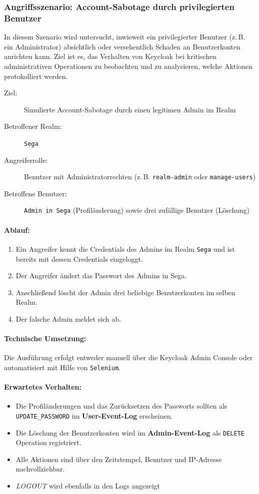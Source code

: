 \documentclass[a4paper,12pt]{article}
\begin{document}
	\subsubsection{Angriffsszenario: Account-Sabotage durch privilegierten Benutzer}
	In diesem Szenario wird untersucht, inwieweit ein privilegierter Benutzer (z.\,B. ein Administrator) absichtlich oder versehentlich Schaden an Benutzerkonten anrichten kann. Ziel ist es, das Verhalten von Keycloak bei kritischen administrativen Operationen zu beobachten und zu analysieren, welche Aktionen protokolliert werden.
	
	\begin{description}
		\item[Ziel:] Simulierte Account-Sabotage durch einen legitimen Admin im Realm
		\item[Betroffener Realm:] \texttt{Sega}
		\item[Angreiferrolle:] Benutzer mit Administratorrechten (z.\,B. \texttt{realm-admin} oder \texttt{manage-users})
		\item[Betroffene Benutzer:] \texttt{Admin in Sega} (Profiländerung) sowie drei zufällige Benutzer (Löschung)
	\end{description}
	
	\paragraph{Ablauf:}
	\begin{enumerate}
		\item Ein Angreifer kennt die Credentials des Admins im Realm \texttt{Sega} und ist bereits mit dessen Credentials eingeloggt.
		\item Der Angreifer ändert das Passwort des Admins in Sega.
		\item Anschließend löscht der Admin drei beliebige Benutzerkonten im selben Realm.
		\item Der falsche Admin meldet sich ab.
	\end{enumerate}
	
	\paragraph{Technische Umsetzung:}
	Die Ausführung erfolgt entweder manuell über die Keycloak Admin Console oder automatisiert mit Hilfe von \texttt{Selenium}.
	
	\paragraph{Erwartetes Verhalten:}
	\begin{itemize}
		\item Die Profiländerungen und das Zurücksetzen des Passworts sollten als \texttt{UPDATE\_PASSWORD} im \textbf{User-Event-Log} erscheinen.
		\item Die Löschung der Benutzerkonten wird im \textbf{Admin-Event-Log} als \texttt{DELETE} Operation registriert.
		\item Alle Aktionen sind über den Zeitstempel, Benutzer und IP-Adresse nachvollziehbar.
		\item \textit{LOGOUT} wird ebenfalls in den Logs angezeigt
	\end{itemize}
	
\end{document}
